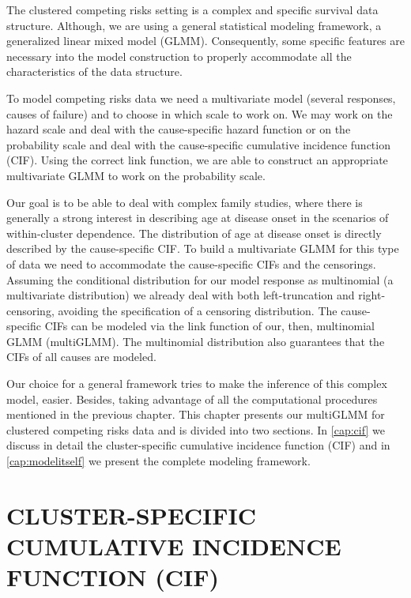 The clustered competing risks setting is a complex and specific survival
data structure. Although, we are using a general statistical modeling
framework, a generalized linear mixed model (GLMM). Consequently, some
specific features are necessary into the model construction to properly
accommodate all the characteristics of the data structure.

To model competing risks data we need a multivariate model (several
responses, causes of failure) and to choose in which scale to work on.
We may work on the hazard scale and deal with the cause-specific hazard
function or on the probability scale and deal with the cause-specific
cumulative incidence function (CIF). Using the correct link function, we
are able to construct an appropriate multivariate GLMM to work on the
probability scale.

Our goal is to be able to deal with complex family studies, where there
is generally a strong interest in describing age at disease onset in the
scenarios of within-cluster dependence. The distribution of age at
disease onset is directly described by the cause-specific CIF. To build
a multivariate GLMM for this type of data we need to accommodate the
cause-specific CIFs and the censorings. Assuming the conditional
distribution for our model response as multinomial (a multivariate
distribution) we already deal with both left-truncation and
right-censoring, avoiding the specification of a censoring distribution.
The cause-specific CIFs can be modeled via the link function of our,
then, multinomial GLMM (multiGLMM). The multinomial distribution also
guarantees that the CIFs of all causes are modeled.

Our choice for a general framework tries to make the inference of this
complex model, easier. Besides, taking advantage of all the
computational procedures mentioned in the previous chapter. This chapter
presents our multiGLMM for clustered competing risks data and is divided
into two sections. In \autoref{cap:cif} we discuss in detail the
cluster-specific cumulative incidence function (CIF) and in
\autoref{cap:modelitself} we present the complete modeling framework.

\section{CLUSTER-SPECIFIC CUMULATIVE INCIDENCE FUNCTION
  (CIF)}
\label{cap:cif}

